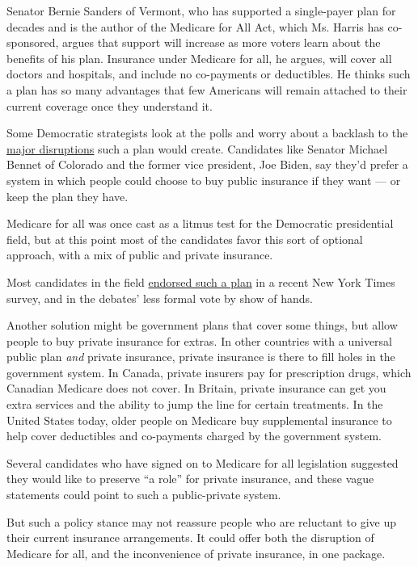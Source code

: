 Senator Bernie Sanders of Vermont, who has supported a single-payer plan
for decades and is the author of the Medicare for All Act, which Ms.
Harris has co-sponsored, argues that support will increase as more
voters learn about the benefits of his plan. Insurance under Medicare
for all, he argues, will cover all doctors and hospitals, and include no
co-payments or deductibles. He thinks such a plan has so many advantages
that few Americans will remain attached to their current coverage once
they understand it.

Some Democratic strategists look at the polls and worry about a backlash
to the
\href{https://www.nytimes3xbfgragh.onion/2019/03/23/health/private-health-insurance-medicare-for-all-bernie-sanders.html}{major
disruptions} such a plan would create. Candidates like Senator Michael
Bennet of Colorado and the former vice president, Joe Biden, say they'd
prefer a system in which people could choose to buy public insurance if
they want --- or keep the plan they have.

Medicare for all was once cast as a litmus test for the Democratic
presidential field, but at this point most of the candidates favor this
sort of optional approach, with a mix of public and private insurance.

Most candidates in the field
\href{https://www.nytimes3xbfgragh.onion/2019/06/23/us/politics/2020-democrats-medicare-for-all-public-option.html?module=inline}{endorsed
such a plan} in a recent New York Times survey, and in the debates' less
formal vote by show of hands.

Another solution might be government plans that cover some things, but
allow people to buy private insurance for extras. In other countries
with a universal public plan \emph{and} private insurance, private
insurance is there to fill holes in the government system. In Canada,
private insurers pay for prescription drugs, which Canadian Medicare
does not cover. In Britain, private insurance can get you extra services
and the ability to jump the line for certain treatments. In the United
States today, older people on Medicare buy supplemental insurance to
help cover deductibles and co-payments charged by the government system.

Several candidates who have signed on to Medicare for all legislation
suggested they would like to preserve ``a role'' for private insurance,
and these vague statements could point to such a public-private system.

But such a policy stance may not reassure people who are reluctant to
give up their current insurance arrangements. It could offer both the
disruption of Medicare for all, and the inconvenience of private
insurance, in one package.


